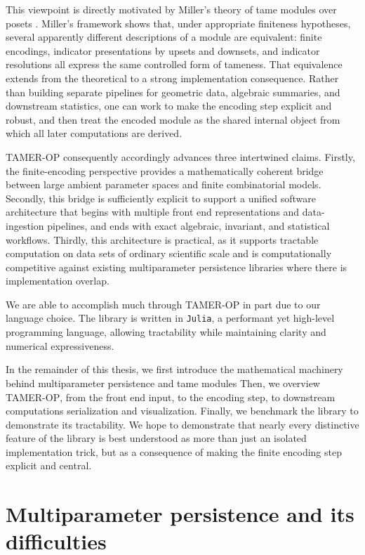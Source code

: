 \documentclass[11pt]{article}
\newcommand{\TAMER}{\textsc{TAMER-OP}}
\theoremstyle{definition}
\theoremstyle{remark}
\begin{document}
This viewpoint is directly motivated by Miller's theory of tame modules over posets \cite{Mil20}. Miller's framework shows that, under appropriate finiteness hypotheses, several apparently different descriptions of a module are equivalent: finite encodings, indicator presentations by upsets and downsets, and indicator resolutions all express the same controlled form of tameness. That equivalence extends from the theoretical to a strong implementation consequence. Rather than building separate pipelines for geometric data, algebraic summaries, and downstream statistics, one can work to make the encoding step explicit and robust, and then treat the encoded module as the shared internal object from which all later computations are derived.

\TAMER{} consequently accordingly advances three intertwined claims. Firstly, the finite-encoding perspective provides a mathematically coherent bridge between large ambient parameter spaces and finite combinatorial models. Secondly, this bridge is sufficiently explicit to support a unified software architecture that begins with multiple front end representations and data-ingestion pipelines, and ends with exact algebraic, invariant, and statistical workflows. Thirdly, this architecture is practical, as it supports tractable computation on data sets of ordinary scientific scale and is computationally competitive against existing multiparameter persistence libraries where there is implementation overlap.

We are able to accomplish much through \TAMER{} in part due to our language choice. The library is written in \texttt{Julia}, a performant yet high-level programming language, allowing tractability while maintaining clarity and numerical expressiveness.

In the remainder of this thesis, we first introduce the mathematical machinery behind multiparameter persistence and tame modules Then, we overview \TAMER{}, from the front end input, to the encoding step, to downstream computations serialization and visualization. Finally, we benchmark the library to demonstrate its tractability. We hope to demonstrate that nearly every distinctive feature of the library is best understood as more than just an isolated implementation trick, but as a consequence of making the finite encoding step explicit and central.



\section{Multiparameter persistence and its difficulties}\label{sec:background}
\end{document}
